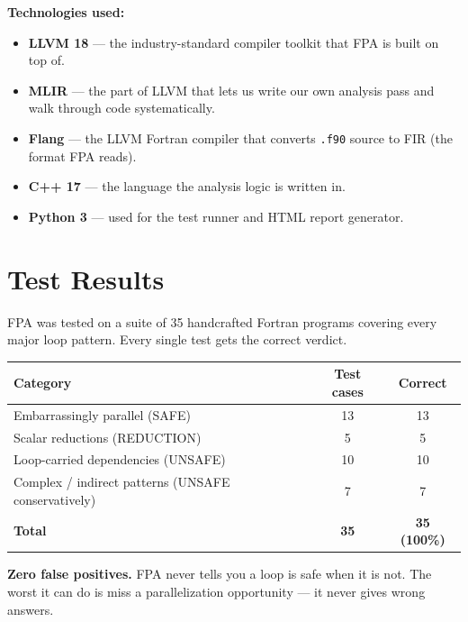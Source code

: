 \documentclass[12pt,a4paper]{article}
\begin{document}
\vspace{6pt}
\textbf{Technologies used:}
\begin{itemize}[leftmargin=1.5em, itemsep=2pt]
  \item \textbf{LLVM 18} --- the industry-standard compiler toolkit
        that FPA is built on top of.
  \item \textbf{MLIR} --- the part of LLVM that lets us write our own
        analysis pass and walk through code systematically.
  \item \textbf{Flang} --- the LLVM Fortran compiler that converts
        \texttt{.f90} source to FIR (the format FPA reads).
  \item \textbf{C++ 17} --- the language the analysis logic is written
        in.
  \item \textbf{Python 3} --- used for the test runner and HTML report
        generator.
\end{itemize}

\section{Test Results}

FPA was tested on a suite of 35 handcrafted Fortran programs covering
every major loop pattern. Every single test gets the correct verdict.

\begin{center}
\begin{tabular}{lcc}
\toprule
\textbf{Category} & \textbf{Test cases} & \textbf{Correct} \\
\midrule
Embarrassingly parallel (SAFE)   & 13 & 13 \\
Scalar reductions (REDUCTION)    &  5 &  5 \\
Loop-carried dependencies (UNSAFE) & 10 & 10 \\
Complex / indirect patterns (UNSAFE conservatively) &  7 &  7 \\
\midrule
\textbf{Total} & \textbf{35} & \textbf{35 (100\%)} \\
\bottomrule
\end{tabular}
\end{center}

\begin{safebox}
\textbf{Zero false positives.} FPA never tells you a loop is safe when
it is not. The worst it can do is miss a parallelization opportunity ---
it never gives wrong answers.
\end{safebox}
\end{document}
